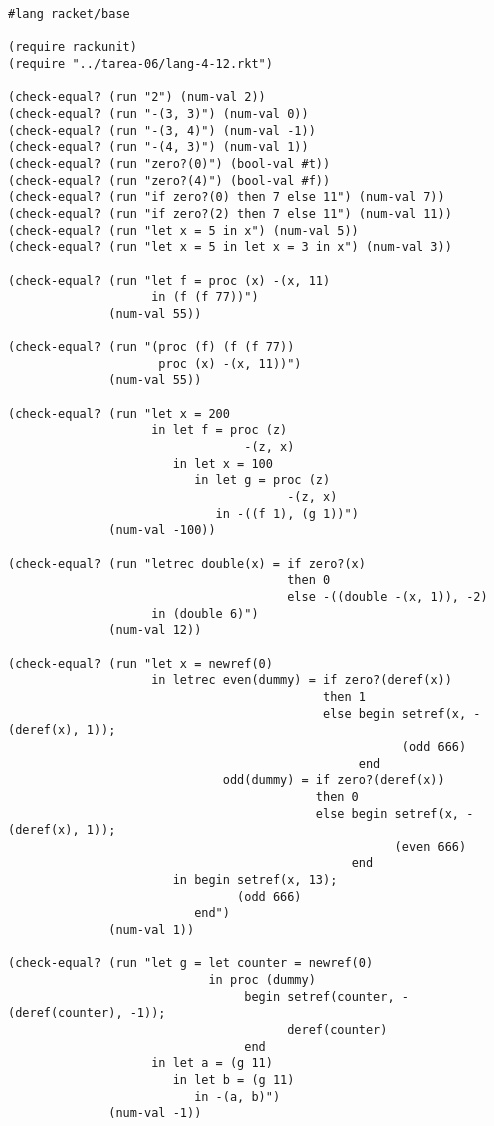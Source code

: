 \documentclass{article}
\begin{document}
\begin{lstlisting}
#lang racket/base

(require rackunit)
(require "../tarea-06/lang-4-12.rkt")

(check-equal? (run "2") (num-val 2))
(check-equal? (run "-(3, 3)") (num-val 0))
(check-equal? (run "-(3, 4)") (num-val -1))
(check-equal? (run "-(4, 3)") (num-val 1))
(check-equal? (run "zero?(0)") (bool-val #t))
(check-equal? (run "zero?(4)") (bool-val #f))
(check-equal? (run "if zero?(0) then 7 else 11") (num-val 7))
(check-equal? (run "if zero?(2) then 7 else 11") (num-val 11))
(check-equal? (run "let x = 5 in x") (num-val 5))
(check-equal? (run "let x = 5 in let x = 3 in x") (num-val 3))

(check-equal? (run "let f = proc (x) -(x, 11)
                    in (f (f 77))")
              (num-val 55))

(check-equal? (run "(proc (f) (f (f 77))
                     proc (x) -(x, 11))")
              (num-val 55))

(check-equal? (run "let x = 200
                    in let f = proc (z)
                                 -(z, x)
                       in let x = 100
                          in let g = proc (z)
                                       -(z, x)
                             in -((f 1), (g 1))")
              (num-val -100))

(check-equal? (run "letrec double(x) = if zero?(x)
                                       then 0
                                       else -((double -(x, 1)), -2)
                    in (double 6)")
              (num-val 12))

(check-equal? (run "let x = newref(0)
                    in letrec even(dummy) = if zero?(deref(x))
                                            then 1
                                            else begin setref(x, -(deref(x), 1));
                                                       (odd 666)
                                                 end
                              odd(dummy) = if zero?(deref(x))
                                           then 0
                                           else begin setref(x, -(deref(x), 1));
                                                      (even 666)
                                                end
                       in begin setref(x, 13);
                                (odd 666)
                          end")
              (num-val 1))

(check-equal? (run "let g = let counter = newref(0)
                            in proc (dummy)
                                 begin setref(counter, -(deref(counter), -1));
                                       deref(counter)
                                 end
                    in let a = (g 11)
                       in let b = (g 11)
                          in -(a, b)")
              (num-val -1))


\end{lstlisting}
\end{document}

